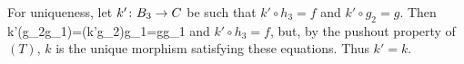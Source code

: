 For uniqueness, let $k'\colon B_3\to C$ be such that $k'\circ h_3=f$ and $k'\circ g_2=g$. Then
\bse
k'\circ(g_2\circ g_1)=(k'\circ g_2)\circ g_1=g\circ g_1
\ese
and $k'\circ h_3=f$, but, by the pushout property of $(T)$, $k$ is the unique morphism satisfying these equations. Thus $k'=k$.
\een
\es


































